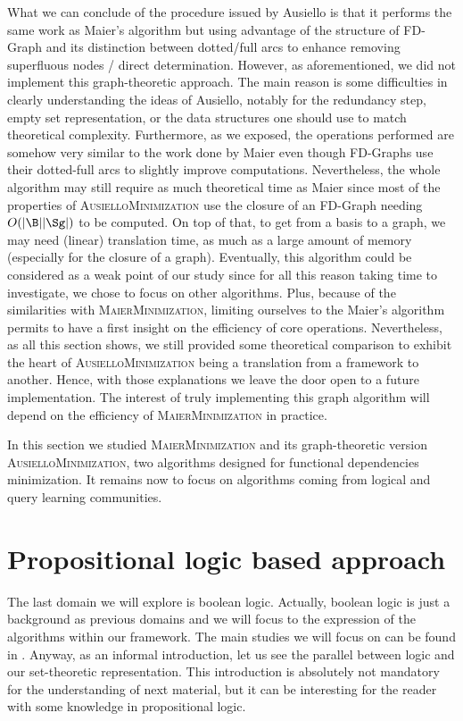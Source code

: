 What we can conclude of the procedure issued by Ausiello is that it performs
the same work as Maier's algorithm but using advantage of the structure of
FD-Graph and its distinction between dotted/full arcs to enhance removing superfluous nodes / direct determination. However, as aforementioned, we did not implement this graph-theoretic approach. The main reason is some difficulties in clearly understanding the ideas of Ausiello, notably for the
redundancy step, empty set representation, or the data structures one should use to match theoretical complexity. Furthermore, as we exposed, the operations performed are somehow very similar to the work done by Maier even though FD-Graphs use their dotted-full arcs to slightly improve computations. Nevertheless, the whole algorithm may still require as much theoretical time as Maier since most of the properties of \textsc{AusielloMinimization} use the closure of an FD-Graph needing $O(|\B||\Sg|)$ to be computed. On top of that, to get from a basis to a graph, we may need (linear) translation time, as much as a large amount of memory (especially for the closure of a graph). Eventually, this algorithm could be considered as a weak point of our study since for all this reason taking time to investigate, we chose to focus on other algorithms. Plus, because of the similarities with \textsc{MaierMinimization}, limiting ourselves to the Maier's algorithm permits to have a first insight on the efficiency of core operations. Nevertheless, as all this section shows, we still provided some theoretical comparison to exhibit the heart of \textsc{AusielloMinimization} being a translation from a framework to another. Hence, with those explanations we leave the door open to a future implementation. The interest of truly implementing this graph algorithm will depend on the efficiency of \textsc{MaierMinimization} in practice.

\vspace{1.2em}

In this section we studied \textsc{MaierMinimization} and its graph-theoretic version \textsc{AusielloMinimization}, two algorithms designed for functional 
dependencies minimization. It remains now to focus on algorithms coming from
logical and query learning communities.


\section{Propositional logic based approach}

The last domain we will explore is boolean logic. Actually, boolean logic is just a background as previous domains and we will focus to the expression of the algorithms within our framework. The main studies we will focus on can be found in \cite{boros_strong_2017, berczi_directed_2017, angluin_learning_1992, arias_canonical_2009}.  Anyway, as an informal introduction, let us see the 
parallel between logic and our set-theoretic representation. This introduction is absolutely not mandatory for the understanding of next material, but it can be interesting for the reader with some knowledge in propositional logic.


